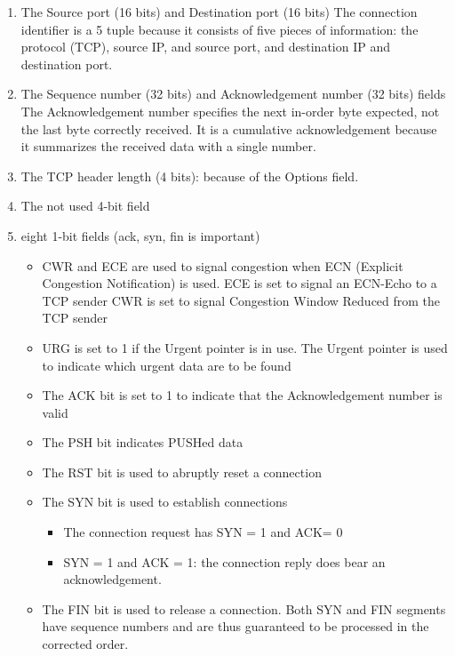 \begin{enumerate}
    \item The Source port (16 bits) and Destination port (16 bits)
    \subitem The connection identifier is a 5 tuple because it consists of five pieces of information: the protocol (TCP), source IP, and source port, and destination IP and destination port.
    \item The Sequence number (32 bits) and Acknowledgement number (32 bits) fields
    \subitem The Acknowledgement number specifies the next in-order byte expected, not the last byte correctly received.
    \subitem It is a cumulative acknowledgement because it summarizes the
    received data with a single number.
    \item The TCP header length (4 bits): because of the Options field. 
    \item The not used 4-bit field
    \item eight 1-bit fields (ack, syn, fin is important)
    \begin{itemize}\small
        \item CWR and ECE are used to signal congestion when ECN (Explicit Congestion Notification) is used.
        \subitem ECE is set to signal an ECN-Echo to a TCP sender
        \subitem CWR is set to signal Congestion Window Reduced from the TCP sender
        \item URG is set to 1 if the Urgent pointer is in use.
        \subitem The Urgent pointer is used to indicate which urgent data are to be found
        \item The ACK bit is set to 1 to indicate that the Acknowledgement number is valid
        \item The PSH bit indicates PUSHed data
        \item The RST bit is used to abruptly reset a connection
        \item The SYN bit is used to establish connections
        \begin{itemize}\scriptsize
            \item The connection request has SYN = 1 and ACK= 0
            \item SYN = 1 and ACK = 1: the connection reply does bear an acknowledgement.
        \end{itemize}
        \item The FIN bit is used to release a connection. 
        \subitem Both SYN and FIN segments have sequence numbers and are thus guaranteed to be processed in the corrected order.
    \end{itemize}

\end{enumerate}
